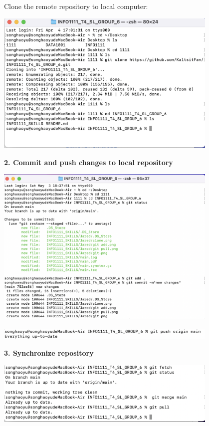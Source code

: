 \documentclass[a4paper, 11pt]{report}
\begin{document}
Clone the remote repository to local computer:
\begin{center}
\includegraphics[width=0.8\textwidth]{Jared/clone.png}
\end{center}

\textbf{2. Commit and push changes to local repository}
\begin{center}
\includegraphics[width=0.8\textwidth]{Jared/gitadd.png}
\end{center}
\begin{center}
\includegraphics[width=0.8\textwidth]{Jared/gitpush.png}  
\end{center}

\textbf{3. Synchronize repository}
\begin{center}
\includegraphics[width=0.8\textwidth]{Jared/git pull.png}  
\end{center}
\end{document}
